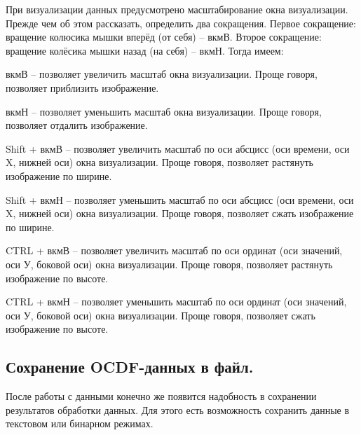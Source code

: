 {\standartFont

  \par При визуализации данных предусмотрено масштабирование окна визуализации. Прежде чем об этом рассказать, определить два сокращения. Первое сокращение: вращение колюсика мышки вперёд (от себя) {--} вкмВ. Второе сокращение: вращение колёсика мышки назад (на себя) {--} вкмН. Тогда имеем: 

  \par вкмВ {--} позволяет увеличить масштаб окна визуализации. Проще говоря, позволяет приблизить изображение. 

  \par вкмН {--} позволяет уменьшить масштаб окна визуализации. Проще говоря, позволяет отдалить изображение. 

  \par Shift + вкмВ {--} позволяет увеличить масштаб по оси абсцисс (оси времени, оси X, нижней оси) окна визуализации. Проще говоря, позволяет растянуть изображение по ширине. 

  \par Shift + вкмН {--} позволяет уменьшить масштаб по оси абсцисс (оси времени, оси X, нижней оси) окна визуализации. Проще говоря, позволяет сжать изображение по ширине.  

  \par CTRL + вкмВ {--} позволяет увеличить масштаб по оси ординат (оси значений, оси У, боковой оси) окна визуализации. Проще говоря, позволяет растянуть изображение по высоте. 

  \par CTRL + вкмН {--} позволяет уменьшить масштаб по оси ординат (оси значений, оси У, боковой оси) окна визуализации. Проще говоря, позволяет сжать изображение по высоте.  

  \par 
}

\subsection{ \standartTitleFont
  Сохранение OCDF-данных в файл.
} \label{subsubsec:OCDFSafe}

{\standartFont

  \par После работы с данными конечно же появится надобность в сохранении результатов обработки данных. Для этого есть возможность сохранить данные в текстовом или бинарном режимах. 

  \par 
}

